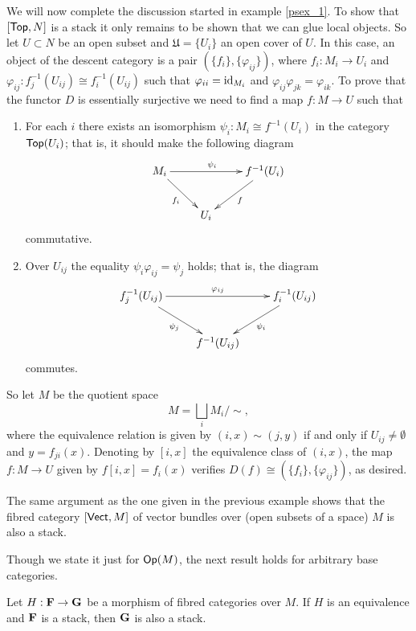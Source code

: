 \begin{ej}\label{st_ex1}
We will now complete the discussion started in example \ref{psex_1}. To show that $[\mathsf{Top},N]$ is a stack it only remains to be shown that we can glue local objects. So let $U\subset N$ be an open subset and $\mathfrak{U}=\{U_i\}$ an open cover of $U$. In this case, an object of the descent category is a pair $(\{f_i\},\{\varphi_{ij}\})$, where $f_i:M_i\to U_i$ and $\varphi_{ij}:f_j^{-1}(U_{ij})\cong f_i^{-1}(U_{ij})$ such that $\varphi_{ii}=\operatorname{id}_{M_i}$ and $\varphi_{ij}\varphi_{jk}=\varphi_{ik}$. To prove that the functor $D$ is essentially surjective we need to find a map $f:M\to U$ such that
\begin{enumerate}
\item For each $i$ there exists an isomorphism $\psi_i:M_i\cong f^{-1}(U_i)$ in the category $\mathsf{Top}(U_i)$; that is, it should make the following diagram
$$
\xymatrix{
M_i \ar[rr]^{\psi_i} \ar[dr]_{f_i} & & f^{-1}(U_i) \ar[dl]^f \\
& U_i &
}
$$
commutative.
\item Over $U_{ij}$ the equality $\psi_i\varphi_{ij}=\psi_j$ holds; that is, the diagram
$$
\xymatrix{
f^{-1}_j(U_{ij})\ar[rr]^{\varphi_{ij}} \ar[dr]_{\psi_j} & & f_i^{-1}(U_{ij}) \ar[dl]^{\psi_i} \\
& f^{-1}(U_{ij}) &
}
$$
commutes.
\end{enumerate}
So let $M$ be the quotient space
$$M=\bigsqcup_iM_i\Big / \sim ,$$
where the equivalence relation is given by $(i,x)\sim (j,y)$ if and only if $U_{ij}\neq \emptyset$ and $y=f_{ji}(x)$. Denoting by $[i,x]$ the equivalence class of $(i,x)$, the map $f:M\to U$ given by $f[i,x]=f_i(x)$ verifies $D(f)\cong (\{f_i\},\{\varphi_{ij}\})$, as desired.
\end{ej}

\begin{ej}\label{st_ex2}
The same argument as the one given in the previous example shows that the fibred category $[\mathsf{Vect},M]$ of vector bundles over (open subsets of a space) $M$ is also a stack.
\end{ej}

Though we state it just for $\mathsf{Op}(M)$, the next result holds for arbitrary base categories.

\begin{proposition}\label{equiv_stacks}
Let $H:{\bf F}\to {\bf G}$ be a morphism of fibred categories over $M$. If $H$ is an equivalence and ${\bf F}$ is a stack, then ${\bf G}$ is also a stack.
\end{proposition}

